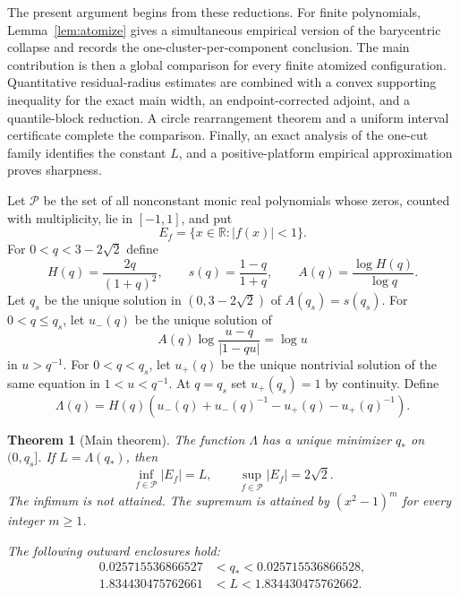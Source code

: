 \documentclass[11pt]{article}
\numberwithin{equation}{section}
\theoremstyle{plain}
\newtheorem{theorem}{Theorem}[section]
\theoremstyle{definition}
\theoremstyle{remark}
\newcommand{\R}{\mathbb R}
\newcommand{\1}{\mathbf 1}
\begin{document}
The present argument begins from these reductions.  For finite polynomials,
Lemma~\ref{lem:atomize} gives a simultaneous empirical version of the
barycentric collapse and records the one-cluster-per-component conclusion.
The main contribution is then a global comparison for every finite atomized
configuration.  Quantitative residual-radius estimates are combined with a
convex supporting inequality for the exact main width, an
endpoint-corrected adjoint, and a quantile-block reduction.  A circle
rearrangement theorem and a uniform interval certificate complete the
comparison.  Finally, an exact analysis of the one-cut family identifies
the constant $L$, and a positive-platform empirical approximation proves
sharpness.

Let $\mathcal P$ be the set of all nonconstant monic real polynomials whose
zeros, counted with multiplicity, lie in $[-1,1]$, and put
\[
 E_f=\{x\in\R:|f(x)|<1\}.
\]
For $0<q<3-2\sqrt2$ define
\[
 H(q)=\frac{2q}{(1+q)^2},\qquad
 s(q)=\frac{1-q}{1+q},\qquad
 A(q)=\frac{\log H(q)}{\log q}.
\]
Let $q_s$ be the unique solution in $(0,3-2\sqrt2)$ of
$A(q_s)=s(q_s)$.  For
$0<q\le q_s$, let $u_-(q)$ be the unique solution of
\[
 A(q)\log\frac{u-q}{|1-qu|}=\log u
\]
in $u>q^{-1}$.  For $0<q<q_s$, let $u_+(q)$ be the unique nontrivial
solution of the same equation in $1<u<q^{-1}$.  At $q=q_s$ set $u_+(q_s)=1$ by
continuity.  Define
\begin{equation}
 \Lambda(q)=H(q)\left(u_-(q)+u_-(q)^{-1}
                         -u_+(q)-u_+(q)^{-1}\right).
\label{eq:1.3}
\end{equation}

\begin{theorem}[Main theorem]\label{thm:main}
The function $\Lambda$ has a unique minimizer $q_*$ on $(0,q_s]$.  If
$L=\Lambda(q_*)$, then
\[
 \boxed{\inf_{f\in\mathcal P}|E_f|=L,
        \qquad \sup_{f\in\mathcal P}|E_f|=2\sqrt2.}
\]
The infimum is not attained.  The supremum is attained by
$(x^2-1)^m$ for every integer $m\ge1$.

The following outward enclosures hold:
\[
\begin{aligned}
 0.025715536866527&<q_*<0.025715536866528,\\
 1.834430475762661&<L<1.834430475762662.
\end{aligned}
\]
\end{theorem}
\end{document}

